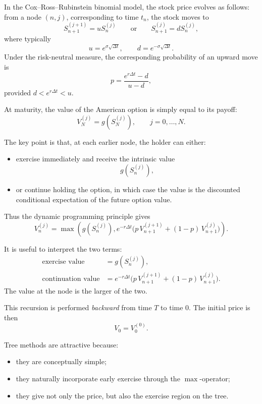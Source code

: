 \documentclass[11pt]{article}
\theoremstyle{definition}
\theoremstyle{plain}
\begin{document}
In the Cox--Ross--Rubinstein binomial model, the stock price evolves as
follows: from a node \((n,j)\), corresponding to time \(t_n\), the stock
moves to
\[
S_{n+1}^{(j+1)} = u S_n^{(j)}
\qquad \text{or} \qquad
S_{n+1}^{(j)} = d S_n^{(j)},
\]
where typically
\[
u = e^{\sigma\sqrt{\Delta t}},
\qquad
d = e^{-\sigma\sqrt{\Delta t}}.
\]
Under the risk-neutral measure, the corresponding probability of an
upward move is
\[
p = \frac{e^{r\Delta t}-d}{u-d},
\]
provided \(d < e^{r\Delta t} < u\).

\medskip

At maturity, the value of the American option is simply equal to its
payoff:
\[
V_N^{(j)} = g\!\left(S_N^{(j)}\right),
\qquad j=0,\dots,N.
\]

The key point is that, at each earlier node, the holder can either:
\begin{itemize}[leftmargin=1.4em]
\item exercise immediately and receive the intrinsic value
\[
g\!\left(S_n^{(j)}\right),
\]
\item or continue holding the option, in which case the value is the
discounted conditional expectation of the future option value.
\end{itemize}

Thus the dynamic programming principle gives
\[
V_n^{(j)}
=
\max\!\left(
g\!\left(S_n^{(j)}\right),
e^{-r\Delta t}
\big(
p\,V_{n+1}^{(j+1)} + (1-p)\,V_{n+1}^{(j)}
\big)
\right).
\]

It is useful to interpret the two terms:
\begin{align*}
\text{exercise value} &= g\!\left(S_n^{(j)}\right),\\
\text{continuation value}
&=
e^{-r\Delta t}
\big(
p\,V_{n+1}^{(j+1)} + (1-p)\,V_{n+1}^{(j)}
\big).
\end{align*}
The value at the node is the larger of the two.

\medskip

This recursion is performed \emph{backward} from time \(T\) to time \(0\).
The initial price is then
\[
V_0 = V_0^{(0)}.
\]

\medskip

Tree methods are attractive because:
\begin{itemize}[leftmargin=1.4em]
\item they are conceptually simple;
\item they naturally incorporate early exercise through the
\(\max\)-operator;
\item they give not only the price, but also the exercise region on the
tree.
\end{itemize}
\end{document}
